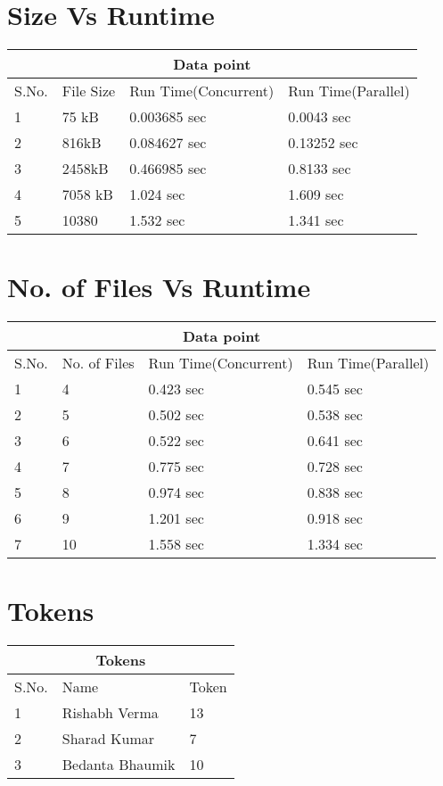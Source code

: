 \documentclass{article}
\begin{document}
\section{Size Vs Runtime}

\begin{tabular}{ |p{1cm}|p{2cm}|p{4cm}|p{3cm}| }
 \hline
 \multicolumn{4}{|c|}{Data point} \\
 \hline
 S.No.& File Size &Run Time(Concurrent)&Run Time(Parallel)\\
 \hline
1   & 75 kB    & 0.003685 sec &  0.0043 sec  \\
\hline
2   &  816kB  & 0.084627 sec & 0.13252 sec \\
\hline
3   & 2458kB     & 0.466985 sec & 0.8133 sec \\
\hline
4   &   7058 kB   & 1.024 sec& 1.609 sec \\
\hline
5   &   10380 & 1.532 sec & 1.341 sec\\

 \hline
\end{tabular}

\section{No. of Files Vs Runtime}
\begin{tabular}{ |p{1cm}|p{2cm}|p{4cm}|p{3cm}| }
 \hline
 \multicolumn{4}{|c|}{Data point} \\
 \hline
 S.No.& No. of Files &Run Time(Concurrent)&Run Time(Parallel)\\
 \hline
1   & 4    & 0.423 sec & 0.545 sec   \\
\hline
2   &  5  & 0.502 sec & 0.538 sec \\
\hline
3   & 6     & 0.522 sec & 0.641 sec\\
\hline
4   &7     & 0.775 sec & 0.728 sec \\
\hline
5   &   8 & 0.974 sec & 0.838 sec\\
\hline
6   & 9    & 1.201 sec & 0.918 sec \\
\hline
7   & 10    & 1.558 sec & 1.334 sec \\
 \hline
\end{tabular}


\section{Tokens}
\begin{tabular}{ |p{1cm}|p{3cm}|p{2cm}| }
 \hline
 \multicolumn{3}{|c|}{Tokens} \\
 \hline
 S.No.& Name&Token\\
 \hline
1   & Rishabh Verma    & 13   \\
\hline
2   &   Sharad Kumar & 7  \\
\hline
3   & Bedanta Bhaumik    & 10  \\


 \hline
\end{tabular}
\end{document}
